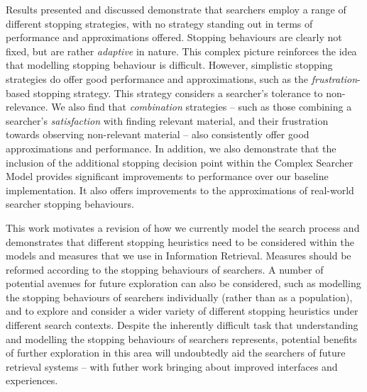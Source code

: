 \begin{preamble}
Results presented and discussed demonstrate that searchers employ a range of different stopping strategies, with no strategy standing out in terms of performance and approximations offered. Stopping behaviours are clearly not fixed, but are rather \emph{adaptive} in nature. This complex picture reinforces the idea that modelling stopping behaviour is difficult. However, simplistic stopping strategies do offer good performance and approximations, such as the \emph{frustration}-based stopping strategy. This strategy considers a searcher's tolerance to non-relevance. We also find that \emph{combination} strategies -- such as those combining a searcher's \emph{satisfaction} with finding relevant material, and their frustration towards observing non-relevant material -- also consistently offer good approximations and performance. In addition, we also demonstrate that the inclusion of the additional stopping decision point within the Complex Searcher Model provides significant improvements to performance over our baseline implementation. It also offers improvements to the approximations of real-world searcher stopping behaviours.

This work motivates a revision of how we currently model the search process and demonstrates that different stopping heuristics need to be considered within the models and measures that we use in Information Retrieval. Measures should be reformed according to the stopping behaviours of searchers. A number of potential avenues for future exploration can also be considered, such as modelling the stopping behaviours of searchers individually (rather than as a population), and to explore and consider a wider variety of different stopping heuristics under different search contexts. Despite the inherently difficult task that understanding and modelling the stopping behaviours of searchers represents, potential benefits of further exploration in this area will undoubtedly aid the searchers of future retrieval systems -- with futher work bringing about improved interfaces and experiences.

\end{preamble}